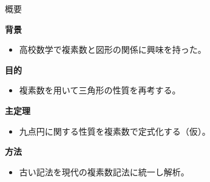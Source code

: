 \documentclass[aspectratio=169]{beamer}
\newenvironment{sectionblock}[1]{%
  \begin{minipage}{\textwidth}%
    \textbf{\large #1}\par\vspace{0.5em}%
}{%
  \end{minipage}\vspace{1em}%
}
\newcommand{\sectioncontent}[2]{%
  \begin{sectionblock}{#1}%
    \begin{itemize}%
      #2%
    \end{itemize}%
  \end{sectionblock}%
}
\begin{document}
\begin{frame}{概要}

\sectioncontent{背景}{
  \item 高校数学で複素数と図形の関係に興味を持った。
}

\sectioncontent{目的}{
  \item 複素数を用いて三角形の性質を再考する。
}

\sectioncontent{主定理}{
  \item 九点円に関する性質を複素数で定式化する（仮）。
}

\sectioncontent{方法}{
  \item 古い記法を現代の複素数記法に統一し解析。
}

\end{frame}
\end{document}
